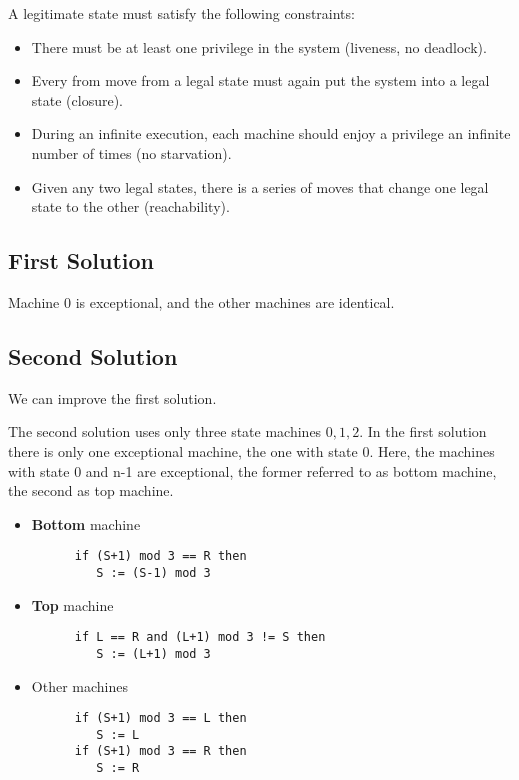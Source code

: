 A legitimate state must satisfy the following constraints:
\begin{itemize}
   \item There must be at least one privilege in the system (liveness, no deadlock).
   \item Every from move from a legal state must again put the system into a legal state (closure).
   \item During an infinite execution, each machine should enjoy a privilege an infinite number of times (no starvation).
   \item Given any two legal states, there is a series of moves that change one legal state to the other (reachability).
\end{itemize}


\subsection{First Solution}

Machine 0 is exceptional, and the other machines are identical.

\subsection{Second Solution}
We can improve the first solution.

The second solution uses only three state machines ${0,1,2}$.
In the first solution there is only one exceptional machine, the one with state 0.
Here, the machines with state 0 and n-1 are exceptional, the former referred to as bottom machine, the second as top machine.

\begin{itemize}
   \item \textbf{Bottom} machine
   \begin{lstlisting}
      if (S+1) mod 3 == R then
         S := (S-1) mod 3 
   \end{lstlisting}
   \item \textbf{Top} machine
   \begin{lstlisting}
      if L == R and (L+1) mod 3 != S then
         S := (L+1) mod 3 
   \end{lstlisting}
   \item Other machines
   \begin{lstlisting}
      if (S+1) mod 3 == L then
         S := L
      if (S+1) mod 3 == R then
         S := R
   \end{lstlisting}
\end{itemize}

